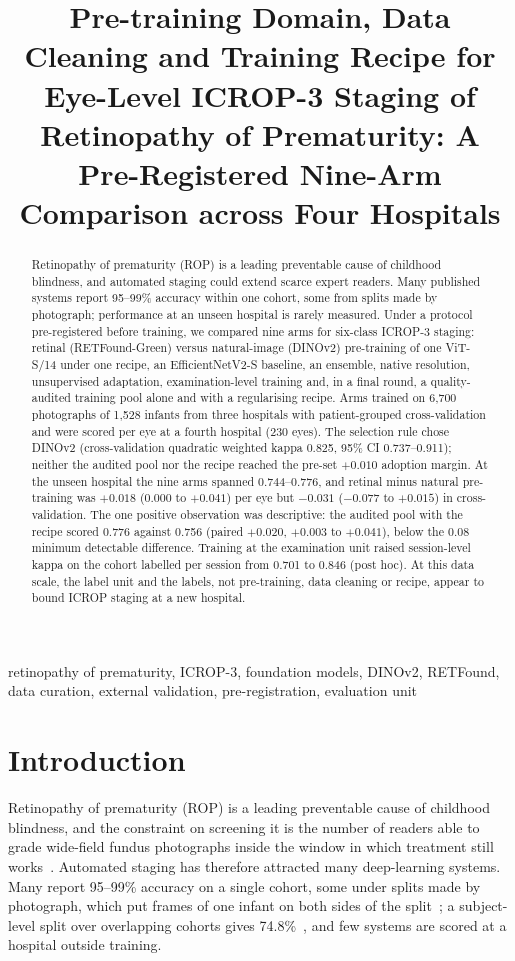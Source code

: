 \documentclass[conference]{IEEEtran}
\title{Pre-training Domain, Data Cleaning and Training Recipe for Eye-Level ICROP-3 Staging of Retinopathy of Prematurity: A Pre-Registered Nine-Arm Comparison across Four Hospitals}
\author{\IEEEauthorblockN{Praharsh Nagpure, \FILL{R. Bait full name}, \FILL{P. Rangnekar full name},\\ \FILL{Y. Shengale full name}, and \FILL{A. Kumar full name}}
\IEEEauthorblockA{Department of Automation and Robotics, Vivekanand Education Society's Institute of Technology, Mumbai, India\\
Corresponding author: \FILL{name, e-mail, ORCID}}}
\begin{document}
\maketitle

\begin{abstract}
Retinopathy of prematurity (ROP) is a leading preventable cause of childhood blindness, and automated staging could extend scarce expert readers. Many published systems report 95--99\% accuracy within one cohort, some from splits made by photograph; performance at an unseen hospital is rarely measured. Under a protocol pre-registered before training, we compared nine arms for six-class ICROP-3 staging: retinal (RETFound-Green) versus natural-image (DINOv2) pre-training of one ViT-S/14 under one recipe, an EfficientNetV2-S baseline, an ensemble, native resolution, unsupervised adaptation, examination-level training and, in a final round, a quality-audited training pool alone and with a regularising recipe. Arms trained on 6{,}700 photographs of 1{,}528 infants from three hospitals with patient-grouped cross-validation and were scored per eye at a fourth hospital (230 eyes). The selection rule chose DINOv2 (cross-validation quadratic weighted kappa 0.825, 95\% CI 0.737--0.911); neither the audited pool nor the recipe reached the pre-set $+0.010$ adoption margin. At the unseen hospital the nine arms spanned 0.744--0.776, and retinal minus natural pre-training was $+0.018$ (0.000 to $+0.041$) per eye but $-0.031$ ($-0.077$ to $+0.015$) in cross-validation. The one positive observation was descriptive: the audited pool with the recipe scored 0.776 against 0.756 (paired $+0.020$, $+0.003$ to $+0.041$), below the 0.08 minimum detectable difference. Training at the examination unit raised session-level kappa on the cohort labelled per session from 0.701 to 0.846 (post hoc). At this data scale, the label unit and the labels, not pre-training, data cleaning or recipe, appear to bound ICROP staging at a new hospital.
\end{abstract}

\begin{IEEEkeywords}
retinopathy of prematurity, ICROP-3, foundation models, DINOv2, RETFound, data curation, external validation, pre-registration, evaluation unit
\end{IEEEkeywords}

\section{Introduction}
Retinopathy of prematurity (ROP) is a leading preventable cause of childhood blindness, and the constraint on screening it is the number of readers able to grade wide-field fundus photographs inside the window in which treatment still works~\cite{icrop3}. Automated staging has therefore attracted many deep-learning systems. Many report 95--99\% accuracy on a single cohort, some under splits made by photograph, which put frames of one infant on both sides of the split~\cite{vahid2026}; a subject-level split over overlapping cohorts gives 74.8\%~\cite{wang2026}, and few systems are scored at a hospital outside training.
\end{document}
